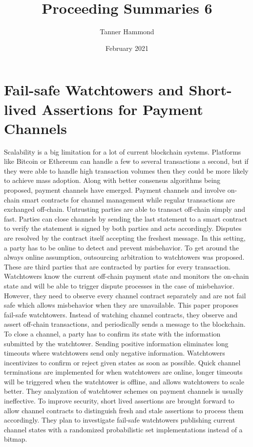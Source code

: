 \documentclass{article}
\title{Proceeding Summaries 6}
\author{Tanner Hammond}
\date{February 2021}
\begin{document}
\maketitle

\section{Fail-safe Watchtowers and Short-lived Assertions for Payment Channels \cite{Failsafe}}

Scalability is a big limitation for a lot of current blockchain systems. Platforms like Bitcoin or Ethereum can handle a few to several transactions a second, but if they were able to handle high transaction volumes then they could be more likely to achieve mass adoption. Along with better consensus algorithms being proposed, payment channels have emerged. Payment channels and involve on-chain smart contracts for channel management while regular transactions are exchanged off-chain. Untrusting parties are able to transact off-chain simply and fast. Parties can close channels by sending the last statement to a smart contract to verify the statement is signed by both parties and acts accordingly. Disputes are resolved by the contract itself accepting the freshest message. In this setting, a party has to be online to detect and prevent misbehavior. To get around the always online assumption, outsourcing arbitration to watchtowers was proposed. These are third parties that are contracted by parties for every transaction. Watchtowers know the current off-chain payment state and monitors the on-chain state and will be able to trigger dispute processes in the case of misbehavior. However, they need to observe every channel contract separately and are not fail safe which allows misbehavior when they are unavailable. This paper proposes fail-safe watchtowers. Instead of watching channel contracts, they observe and assert off-chain transactions, and periodically sends a message to the blockchain. To close a channel, a party has to confirm its state with the information submitted by the watchtower. Sending positive information eliminates long timeouts where watchtowers send only negative information. Watchtowers incentivizes to confirm or reject given states as soon as possible. Quick channel terminations are implemented for when watchtowers are online, longer timeouts will be triggered when the watchtower is offline, and allows watchtowers to scale better. They analyzation of watchtower schemes on payment channels is usually ineffective. To improve security, short lived assertions are brought forward to allow channel contracts to distinguish fresh and stale assertions to process them accordingly. They plan to investigate fail-safe watchtowers publishing current channel states with a randomized probabilistic set implementations instead of a bitmap.
\end{document}

